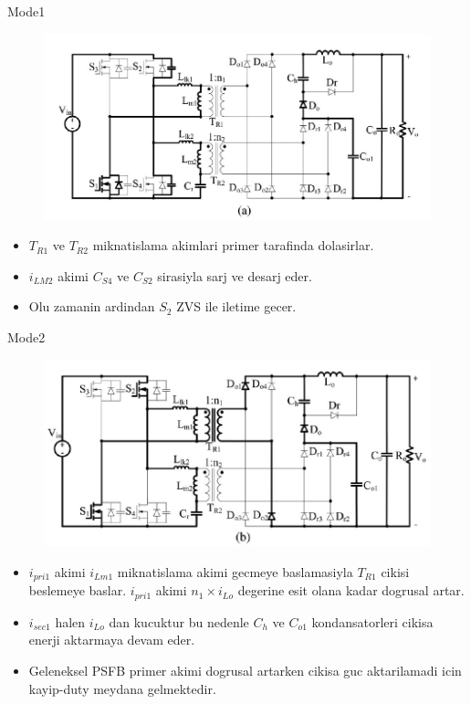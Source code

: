 \documentclass[10pt]{beamer}
\begin{document}
\begin{frame}{Mode1}
	\begin{figure}
		\centering
		\includegraphics[scale=0.30]{mode_a.png}
	\end{figure}
	\begin{itemize}
		\item $T_{R1}$ ve $T_{R2}$ miknatislama akimlari primer tarafinda dolasirlar.
		\item $i_{LM2}$ akimi $C_{S4}$ ve $C_{S2}$ sirasiyla sarj ve desarj eder.
		\item Olu zamanin ardindan $S_{2}$ ZVS ile iletime gecer.
	\end{itemize}
\end{frame}

\begin{frame}{Mode2}
	\begin{figure}
		\centering
		\includegraphics[scale=0.30]{mode_b.png}
	\end{figure}
	\begin{itemize}
		\item $i_{pri1}$ akimi $i_{Lm1}$ miknatislama akimi gecmeye baslamasiyla $T_{R1}$ cikisi beslemeye baslar. $i_{pri1}$ akimi $n_1 \times i_{Lo}$ degerine esit olana kadar dogrusal artar.
 		\item $i_{sec1}$ halen $i_{Lo}$ dan kucuktur bu nedenle $C_h$ ve $C_{o1}$ kondansatorleri cikisa enerji aktarmaya devam eder.
		\item Geleneksel PSFB primer akimi dogrusal artarken cikisa guc aktarilamadi icin kayip-duty meydana gelmektedir.
	\end{itemize}
\end{frame}
\end{document}
